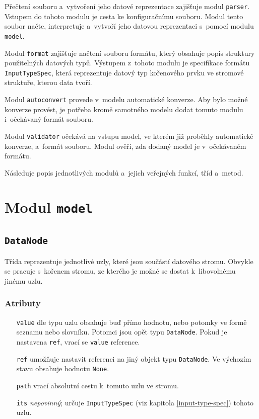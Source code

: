 \documentclass[FM,MP]{tulthesis}
\begin{document}
	Přečtení souboru a~vytvoření jeho datové reprezentace zajišťuje modul \texttt{parser}. Vstupem do tohoto modulu je cesta ke konfiguračnímu souboru. Modul tento soubor načte, interpretuje a~vytvoří jeho datovou reprezentaci s~pomocí modulu \texttt{model}.

	Modul \texttt{format} zajišťuje načtení souboru formátu, který obsahuje popis struktury použitelných datových typů. Výstupem z~tohoto modulu je specifikace formátu \texttt{InputTypeSpec}, která reprezentuje datový typ kořenového prvku ve stromové struk\-tuře, kterou data tvoří.

	Modul \texttt{autoconvert} provede v~modelu automatické konverze. Aby bylo možné konverze provést, je potřeba kromě samotného modelu dodat tomuto modulu i~oče\-kávaný formát souboru.

	Modul \texttt{validator} očekává na vstupu model, ve kterém již proběhly automatické konverze, a~formát souboru. Modul ověří, zda dodaný model je v~očekávaném formátu.

	Následuje popis jednotlivých modulů a~jejich veřejných funkcí, tříd a~metod.

	\section{Modul \texttt{model}}

		\subsection*{\texttt{DataNode}}
			Třída reprezentuje jednotlivé uzly, které jsou součástí datového stromu. Obvykle se pracuje s~kořenem stromu, ze kterého je možné se dostat k~libovolnému jinému uzlu.

			\subsubsection{Atributy}
				\begin{itemize}[leftmargin=2cm]
					\setlength\itemsep{-2mm}
					\item[\texttt{value}] dle typu uzlu obsahuje buď přímo hodnotu, nebo potomky ve formě seznamu nebo slovníku. Potomci jsou opět typu \texttt{DataNode}. Pokud je nastavena \texttt{ref}, vrací se \texttt{value} reference.
					\item[\texttt{ref}] umožňuje nastavit referenci na jiný objekt typu \texttt{DataNode}. Ve výchozím stavu obsahuje hodnotu \texttt{None}.
					\item[\texttt{path}] vrací absolutní cestu k~tomuto uzlu ve stromu.
					\item[\texttt{its}] \textit{nepovinný}; určuje \texttt{InputTypeSpec} (viz kapitola \ref{input-type-spec}) tohoto uzlu.
				\end{itemize}
			
\end{document}
